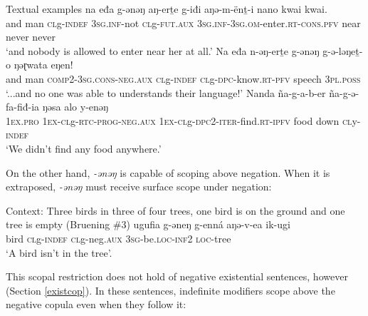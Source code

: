 \ea Textual examples \label{textany} %
\ea \gll  na eđa g-ənəŋ aŋ-erṯe g-iđi aŋə-m-ënṯ-i nano kwai kwai.\\
and man \textsc{cl}g-\textsc{indef} 3\textsc{sg}.\textsc{inf}-not \textsc{cl}g-\textsc{fut.aux} 3\textsc{sg}.\textsc{inf}-3\textsc{sg}.\textsc{om}-enter.\textsc{rt}-\textsc{cons}.\textsc{pfv} near never never\\
\glt  `and nobody is allowed to enter near her at all.'
\ex \gll Na eđa n-ǝŋ-erṯe g-ǝnǝŋ g-ǝ-lǝŋeṯ-o ŋǝɽwata eŋen!\\
and man \textsc{comp}2-\textsc{3sg.cons}-\textsc{neg.aux} \textsc{cl}g-\textsc{indef} \textsc{cl}g-\textsc{dpc}-know.\textsc{rt}-\textsc{pfv} speech 3\textsc{pl}.\textsc{poss}\\
\glt `...and no one was able to understands their language!'
\ex \gll Nanda ña-g-a-b-er ña-g-ǝ-fa-fiđ-ia ŋǝsa alo y-enǝŋ\\
1\textsc{ex.pro} 1\textsc{ex}-\textsc{cl}g-\textsc{rtc}-\textsc{prog}-\textsc{neg.aux} 1\textsc{ex}-\textsc{cl}g-\textsc{dpc}2-\textsc{iter}-find.\textsc{rt}-\textsc{ipfv} food down \textsc{cl}y-\textsc{indef}\\
\glt `We didn’t find any food anywhere.'
\z
\z 

On the other hand, \textit{-ənəŋ} is capable of scoping above negation. When it is extraposed, \textit{-ənəŋ} must receive surface scope under negation:

\ea Context: Three birds in three of four trees, one bird is on the ground and one tree is empty (Bruening \#3)
	\ea  \gll ugufia g-əneŋ g-enná aŋə-v-ea ik-ugi	\\
			 bird \textsc{cl}g-\textsc{indef} \textsc{cl}g-neg.\textsc{aux} 3\textsc{sg}-be.\textsc{loc}-\textsc{inf}2 \textsc{loc}-tree\\
		\glt 	‘A bird isn’t in the tree’.
	\z
\z

This scopal restriction does not hold of negative existential sentences, however (Section \ref{existcop}). In these sentences, indefinite modifiers scope above the negative copula even when they follow it:

